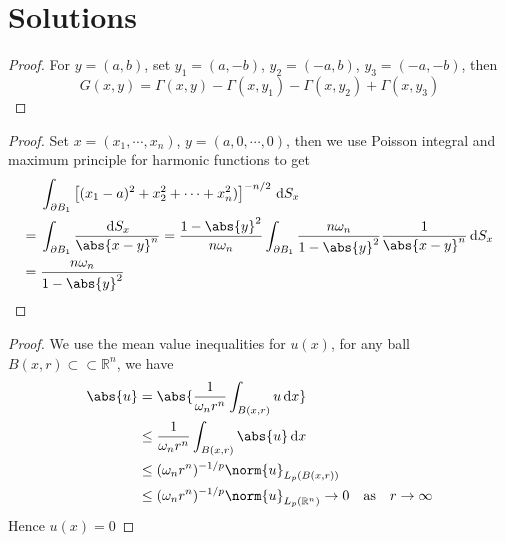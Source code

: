 \documentclass[a4paper]{article}
\newcommand\diff{\,\mathrm{d}}
\DeclarePairedDelimiter{\norm}\lVert\rVert
\DeclarePairedDelimiter{\abs}\lvert\rvert
\def\R{\mathbb{R}}
\begin{document}
\section{Solutions}
\setcounter{proof}{3}
\begin{proof}
For $y = (a, b)$, set $y_1 = (a, -b)$, $y_2 = (-a, b)$, $y_3 = (-a, -b)$, then
\begin{equation*}
G(x, y) = \Gamma(x,y) - \Gamma(x,y_1) - \Gamma(x,y_2) + \Gamma(x,y_3)
\end{equation*}
\end{proof}
\begin{proof}
Set $x = (x_1, \cdots, x_n)$, $y = (a, 0, \cdots, 0)$, 
then we use Poisson integral and maximum principle for harmonic functions to get
\begin{equation*}
\begin{split}
& \int_{\partial B_1} \left[ (x_1 - a)^2 + x_2^2 + \cdots + x_n^2)\right]^{-n/2} \diff S_x \\
={} & \int_{\partial B_1} \frac{\diff S_x}{\abs{x-y}^n}
= \frac{1-\abs{y}^2}{n\omega_n}\int_{\partial B_1} \frac{n\omega_n}{1-\abs{y}^2}\frac{1}{\abs{x-y}^n} \diff S_x \\
={} & \frac{n\omega_n}{1-\abs{y}^2}
\end{split}
\end{equation*}
\end{proof}
\setcounter{proof}{6}
\begin{proof}
We use the mean value inequalities for $u(x)$, for any ball $B(x,r) \subset \subset \R^n$, we have
\begin{align*}
\abs{u} &= \abs{\frac{1}{\omega_n r^n}\int_{B(x,r)} u \diff x} \\
&\leq \frac{1}{\omega_n r^n}\int_{B(x,r)} \abs{u} \diff x \\
&\leq (\omega_n r^n)^{-1/p}\norm{u}_{L_p(B(x,r))} \\
&\leq (\omega_n r^n)^{-1/p}\norm{u}_{L_p(\R^n)} \to 0 \quad \text{as} \quad r \to \infty 
\end{align*}
Hence $u(x) = 0$
\end{proof}
\setcounter{proof}{8}
\end{document}
